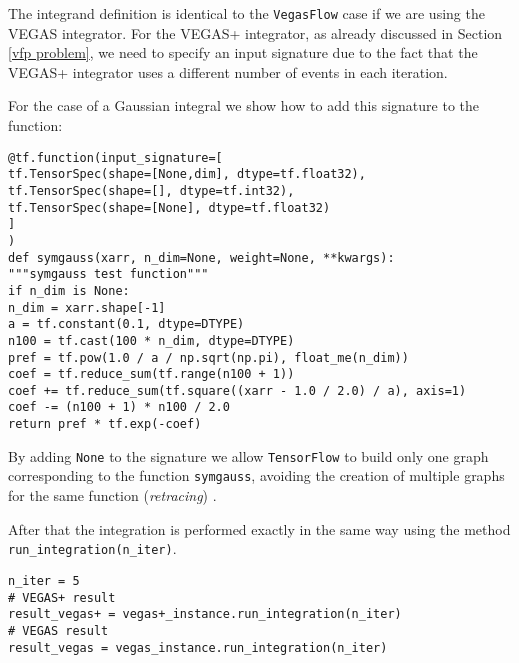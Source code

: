 \documentclass[../main/main.tex]{subfiles}
\begin{document}
The integrand definition is identical to the \texttt{VegasFlow} case if we are using the VEGAS integrator. 
For the VEGAS+ integrator, as already discussed in Section \ref{vfp problem}, we need to specify an input signature due to the fact that the VEGAS+ integrator uses a different number of events in each iteration.

For the case of a Gaussian integral we show how to add this signature to the function:

\begin{verbatim}
@tf.function(input_signature=[
tf.TensorSpec(shape=[None,dim], dtype=tf.float32),
tf.TensorSpec(shape=[], dtype=tf.int32),
tf.TensorSpec(shape=[None], dtype=tf.float32)
]
)
def symgauss(xarr, n_dim=None, weight=None, **kwargs):
"""symgauss test function"""
if n_dim is None:
n_dim = xarr.shape[-1]
a = tf.constant(0.1, dtype=DTYPE)
n100 = tf.cast(100 * n_dim, dtype=DTYPE)
pref = tf.pow(1.0 / a / np.sqrt(np.pi), float_me(n_dim))
coef = tf.reduce_sum(tf.range(n100 + 1))
coef += tf.reduce_sum(tf.square((xarr - 1.0 / 2.0) / a), axis=1)
coef -= (n100 + 1) * n100 / 2.0
return pref * tf.exp(-coef)
\end{verbatim}

By adding \texttt{None} to the signature we allow \texttt{TensorFlow} to build only one graph corresponding to the function \texttt{symgauss}, avoiding the creation of multiple graphs for the same function (\emph{retracing}) .

After that the integration is performed exactly in the same way using the method \texttt{run\_integration(n\_iter)}.

\begin{verbatim}
n_iter = 5
# VEGAS+ result
result_vegas+ = vegas+_instance.run_integration(n_iter)
# VEGAS result
result_vegas = vegas_instance.run_integration(n_iter)
\end{verbatim}
\end{document}
